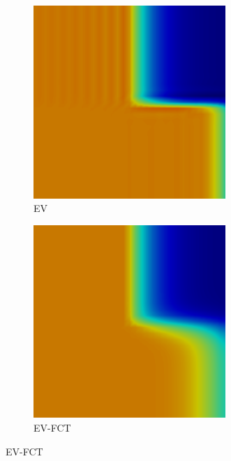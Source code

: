 \documentclass{beamer} \useoutertheme{infolines}
\begin{document}
\begin{frame}
\begin{figure}[h]
\begin{subfigure}{0.3\textwidth}
      \includegraphics[width=0.8\textwidth]{./figures/EV.png}
      \caption{EV}
   \end{subfigure}
   \begin{subfigure}{0.3\textwidth}
      \includegraphics[width=0.8\textwidth]{./figures/EVFCT.png}
      \caption{EV-FCT}
   \end{subfigure}
\end{figure}

\end{frame}
\end{document}
